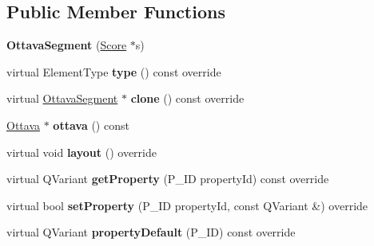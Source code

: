 \subsection*{Public Member Functions}
\begin{DoxyCompactItemize}
\item 
\mbox{\label{class_ms_1_1_ottava_segment_a4a691514b76bc0df0984861dcd1f587a}} 
{\bfseries Ottava\+Segment} (\hyperlink{class_ms_1_1_score}{Score} $\ast$s)
\item 
\mbox{\label{class_ms_1_1_ottava_segment_abf92fbe1b69c61c76673b01445a48898}} 
virtual Element\+Type {\bfseries type} () const override
\item 
\mbox{\label{class_ms_1_1_ottava_segment_a0f698a1a2b7c1a56d1079a01a8a82c02}} 
virtual \hyperlink{class_ms_1_1_ottava_segment}{Ottava\+Segment} $\ast$ {\bfseries clone} () const override
\item 
\mbox{\label{class_ms_1_1_ottava_segment_a4c422cc5ef7e2239e7675732fb2a4d27}} 
\hyperlink{class_ms_1_1_ottava}{Ottava} $\ast$ {\bfseries ottava} () const
\item 
\mbox{\label{class_ms_1_1_ottava_segment_a598e274b7a7e1bb15c8d3f4d8d98b5a0}} 
virtual void {\bfseries layout} () override
\item 
\mbox{\label{class_ms_1_1_ottava_segment_af8547c7166b76c3f6fcdd33aceb0a282}} 
virtual Q\+Variant {\bfseries get\+Property} (P\+\_\+\+ID property\+Id) const override
\item 
\mbox{\label{class_ms_1_1_ottava_segment_ae314572746bc1bde3cbee84700915e52}} 
virtual bool {\bfseries set\+Property} (P\+\_\+\+ID property\+Id, const Q\+Variant \&) override
\item 
\mbox{\label{class_ms_1_1_ottava_segment_afc7117381e7212e48092c3dd8b517591}} 
virtual Q\+Variant {\bfseries property\+Default} (P\+\_\+\+ID) const override
\item 
\mbox{\label{class_ms_1_1_ottava_segment_a83dc4f47d9fe939eff7b2982b8245791}} 

\end{DoxyCompactItemize}
